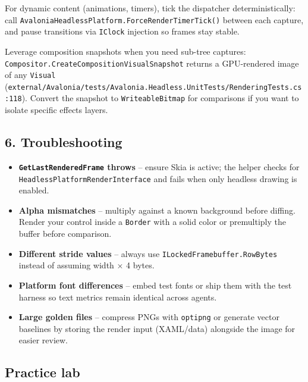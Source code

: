 For dynamic content (animations, timers), tick the dispatcher
deterministically: call
\passthrough{\lstinline!AvaloniaHeadlessPlatform.ForceRenderTimerTick()!}
between each capture, and pause transitions via
\passthrough{\lstinline!IClock!} injection so frames stay stable.

Leverage composition snapshots when you need sub-tree captures:
\passthrough{\lstinline!Compositor.CreateCompositionVisualSnapshot!}
returns a GPU-rendered image of any \passthrough{\lstinline!Visual!}
(\passthrough{\lstinline!external/Avalonia/tests/Avalonia.Headless.UnitTests/RenderingTests.cs:118!}).
Convert the snapshot to \passthrough{\lstinline!WriteableBitmap!} for
comparisons if you want to isolate specific effects layers.

\subsection{6. Troubleshooting}\label{troubleshooting-4}

\begin{itemize}
\tightlist
\item
  \textbf{\passthrough{\lstinline!GetLastRenderedFrame!} throws} --
  ensure Skia is active; the helper checks for
  \passthrough{\lstinline!HeadlessPlatformRenderInterface!} and fails
  when only headless drawing is enabled.
\item
  \textbf{Alpha mismatches} -- multiply against a known background
  before diffing. Render your control inside a
  \passthrough{\lstinline!Border!} with a solid color or premultiply the
  buffer before comparison.
\item
  \textbf{Different stride values} -- always use
  \passthrough{\lstinline!ILockedFramebuffer.RowBytes!} instead of
  assuming width × 4 bytes.
\item
  \textbf{Platform font differences} -- embed test fonts or ship them
  with the test harness so text metrics remain identical across agents.
\item
  \textbf{Large golden files} -- compress PNGs with
  \passthrough{\lstinline!optipng!} or generate vector baselines by
  storing the render input (XAML/data) alongside the image for easier
  review.
\end{itemize}

\subsection{Practice lab}\label{practice-lab-7}

